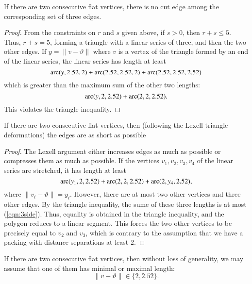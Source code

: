 \begin{lemma}
If there are two consecutive flat vertices, there is no cut edge among the corresponding set of three edges.
\end{lemma}

\begin{proof}  From the constraints on $r$ and $s$ given above, if $s>0$, then $r+s\le 5$.  Thus, $r+s=5$, forming a triangle with a linear series of three, and then the two other edges.  If $y=\|v-\vartheta\|$ where $v$ is a vertex of the triangle formed by an end of the linear series, the linear series has length at least
$$
\operatorname{arc}(y,2.52,2)+\operatorname{arc}(2.52,2.52,2) +\operatorname{arc}(2.52,2.52,2.52)
$$
which is greater than the maximum sum of the other two lengths:
$$
\operatorname{arc}(y,2,2.52)+\operatorname{arc}(2,2,2.52).
$$
This violates the triangle inequality.
\end{proof}

\begin{lemma}  If there are two consecutive flat vertices, then (following the Lexell triangle deformations) the edges are as short as possible
\end{lemma}

\begin{proof} The Lexell argument either increases edges as much as possible or compresses them as much as possible.  If the vertices $v_1,v_2,v_3,v_4$ of the linear series are stretched, it has length at least
\begin{equation}\label{eqn:3side}
\operatorname{arc}(y_1,2,2.52)+\operatorname{arc}(2,2,2.52)+\operatorname{arc}(2,y_4,2.52),
\end{equation}
where $\|v_i-\vartheta\|=y_i$.
However, there are at most two other vertices and three other edges.  By the triangle inequality, the sume of these three lengths is at most (\ref{eqn:3side}).
Thus, equality is obtained in the triangle inequality, and the polygon reduces to a linear segment.  This forces the two other vertices to be precisely equal to $v_2$ and $v_3$, which is contrary to the assumption that we have a packing with distance separations at least $2$.
\end{proof}

\begin{lemma} If there are two consecutive flat vertices, then without loss of generality, we may assume that one of them has minimal or maximal length:
$$\|v-\vartheta\|\in \{2,2.52\}.$$
\end{lemma}

